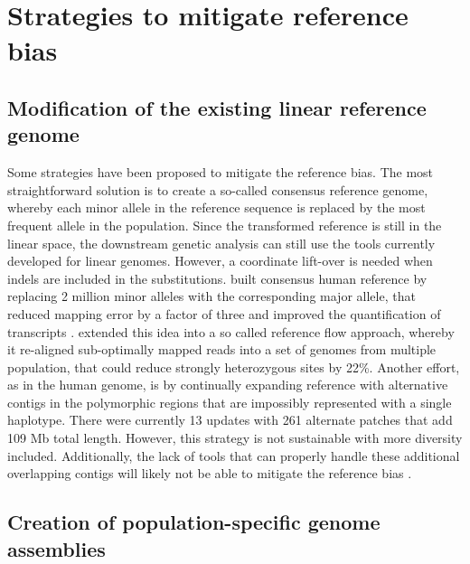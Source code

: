 \documentclass[../main.tex]{subfiles}
\begin{document}
\section{Strategies to mitigate reference bias}

\subsection*{Modification of the existing linear reference genome}

Some strategies have been proposed to mitigate the reference bias. The most straightforward solution is to create a so-called consensus reference genome, whereby each minor allele in the reference sequence is replaced by the most frequent allele in the population. Since the transformed reference is still in the linear space, the downstream genetic analysis can still use the tools currently developed for linear genomes. However, a coordinate lift-over is needed when indels are included in the substitutions. \citet{ballouz2019time} built consensus human reference by replacing 2 million minor alleles with the corresponding major allele, that reduced mapping error by a factor of three and improved the quantification of transcripts \citep{kaminow2020virtue}. \citet{chen2021reference} extended this idea into a so called reference flow approach, whereby it re-aligned sub-optimally mapped reads into a set of genomes from multiple population, that could reduce strongly heterozygous sites by 22\%. Another effort, as in the human genome, is by continually expanding reference with alternative contigs in the polymorphic regions that are impossibly represented with a single haplotype. There were currently 13 updates with 261 alternate patches that add 109 Mb total length. However, this strategy is not sustainable with more diversity included. Additionally, the lack of tools that can properly handle these additional overlapping contigs will likely not be able to mitigate the reference bias \citep{sherman2020pan}. 

\subsection*{Creation of population-specific genome assemblies}
\end{document}
